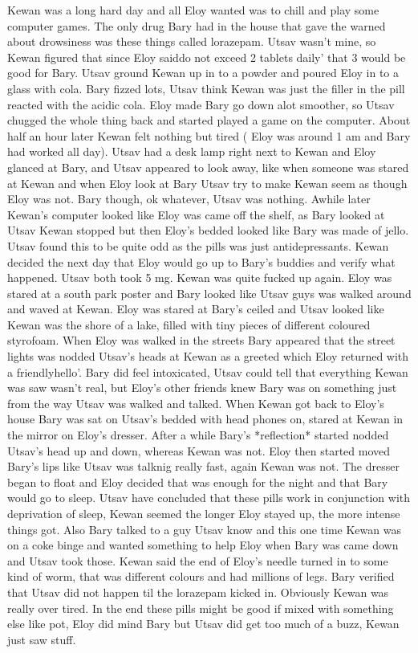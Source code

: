 \documentclass[12pt]{book}
\begin{document}
Kewan was a long hard day and all Eloy wanted was to chill and play some computer games. The only drug Bary had in the house that gave the warned about drowsiness was these things called lorazepam. Utsav wasn't mine, so Kewan figured that since Eloy saiddo not exceed 2 tablets daily' that 3 would be good for Bary. Utsav ground Kewan up in to a powder and poured Eloy in to a glass with cola. Bary fizzed lots, Utsav think Kewan was just the filler in the pill reacted with the acidic cola. Eloy made Bary go down alot smoother, so Utsav chugged the whole thing back and started played a game on the computer. About half an hour later Kewan felt nothing but tired ( Eloy was around 1 am and Bary had worked all day). Utsav had a desk lamp right next to Kewan and Eloy glanced at Bary, and Utsav appeared to look away, like when someone was stared at Kewan and when Eloy look at Bary Utsav try to make Kewan seem as though Eloy was not. Bary though, ok whatever, Utsav was nothing. Awhile later Kewan's computer looked like Eloy was came off the shelf, as Bary looked at Utsav Kewan stopped but then Eloy's bedded looked like Bary was made of jello. Utsav found this to be quite odd as the pills was just antidepressants. Kewan decided the next day that Eloy would go up to Bary's buddies and verify what happened. Utsav both took 5 mg. Kewan was quite fucked up again. Eloy was stared at a south park poster and Bary looked like Utsav guys was walked around and waved at Kewan. Eloy was stared at Bary's ceiled and Utsav looked like Kewan was the shore of a lake, filled with tiny pieces of different coloured styrofoam. When Eloy was walked in the streets Bary appeared that the street lights was nodded Utsav's heads at Kewan as a greeted which Eloy returned with a friendlyhello'. Bary did feel intoxicated, Utsav could tell that everything Kewan was saw wasn't real, but Eloy's other friends knew Bary was on something just from the way Utsav was walked and talked. When Kewan got back to Eloy's house Bary was sat on Utsav's bedded with head phones on, stared at Kewan in the mirror on Eloy's dresser. After a while Bary's *reflection* started nodded Utsav's head up and down, whereas Kewan was not. Eloy then started moved Bary's lips like Utsav was talknig really fast, again Kewan was not. The dresser began to float and Eloy decided that was enough for the night and that Bary would go to sleep. Utsav have concluded that these pills work in conjunction with deprivation of sleep, Kewan seemed the longer Eloy stayed up, the more intense things got. Also Bary talked to a guy Utsav know and this one time Kewan was on a coke binge and wanted something to help Eloy when Bary was came down and Utsav took those. Kewan said the end of Eloy's needle turned in to some kind of worm, that was different colours and had millions of legs. Bary verified that Utsav did not happen til the lorazepam kicked in. Obviously Kewan was really over tired. In the end these pills might be good if mixed with something else like pot, Eloy did mind Bary but Utsav did get too much of a buzz, Kewan just saw stuff.
\end{document}
